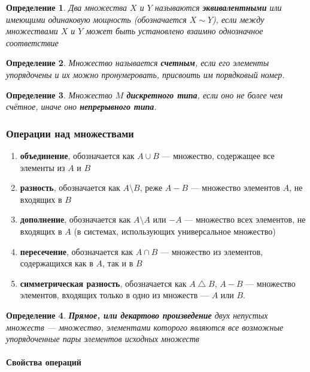 \documentclass{article}
\newtheorem{definition}{Определение}
\begin{document}
\begin{definition}
    Два множества $X$ и $Y$ называются \textbf{эквивалентными} или имеющими одинаковую мощность (обозначается $X \sim Y$), если между множествами $X$ и $Y$ может быть установлено взаимно однозначное соответствие
\end{definition}

\begin{definition}
    Множество называется \textbf{счетным}, если его элементы упорядочены и их можно пронумеровать, присвоить им порядковый номер.
\end{definition}

\begin{definition}
    Множество $M$ \textbf{дискретного типа}, если оно не более чем счётное, иначе оно \textbf{непрерывного типа}.
\end{definition}

\subsubsection{Операции над множествами}

\begin{enumerate}
    \item \textbf{объединение}, обозначается как $A \cup B$ — множество, содержащее все элементы из $A$ и $B$
    \item \textbf{разность}, обозначается как $A \setminus B$, реже $A - B$ — множество элементов $A$, не входящих в $B$
    \item \textbf{дополнение}, обозначается как $A \setminus A$ или $-A$ — множество всех элементов, не входящих в $A$ (в системах, использующих универсальное множество)
    \item \textbf{пересечение}, обозначается как $A \cap B$ — множество из элементов, содержащихся как в $A$, так и в $B$
    \item \textbf{симметрическая разность}, обозначается как  $A \bigtriangleup B$, $A - B$ — множество элементов, входящих только в одно из множеств — $A$ или $B$.
\end{enumerate}

\begin{definition}
    \textbf{Прямое, или декартово произведение} двух непустых множеств — множество, элементами которого являются все возможные упорядоченные пары элементов исходных множеств
\end{definition}

\paragraph{Свойства операций}
\end{document}
